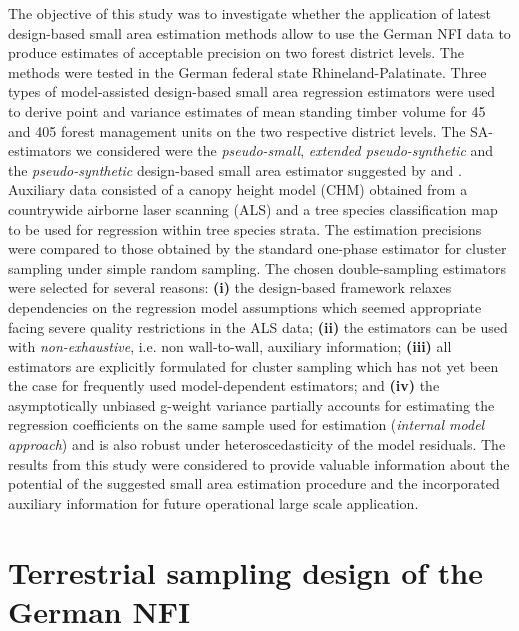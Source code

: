 \documentclass[remotesensing,article,submit,moreauthors,pdftex,10pt,a4paper]{mdpi}
\begin{document}
The objective of this study was to investigate whether the application of latest design-based small area estimation methods allow to use the German NFI data to produce estimates of acceptable precision on two forest district levels. The methods were tested in the German federal state Rhineland-Palatinate. Three types of model-assisted design-based small area regression estimators were used to derive point and variance estimates of mean standing timber volume for 45 and 405 forest management units on the two respective district levels. The SA-estimators we considered were the \textit{pseudo-small}, \textit{extended pseudo-synthetic} and the \textit{pseudo-synthetic} design-based small area estimator suggested by \citet{mandallaz2013a} and \citet{ mandallaz2013b}. Auxiliary data consisted of a canopy height model (CHM) obtained from a countrywide airborne laser scanning (ALS) and a tree species classification map to be used for regression within tree species strata. The estimation precisions were compared to those obtained by the standard one-phase estimator for cluster sampling under simple random sampling. The chosen double-sampling estimators were selected for several reasons: \textbf{(i)} the design-based framework relaxes dependencies on the regression model assumptions which seemed appropriate facing severe quality restrictions in the ALS data; \textbf{(ii)} the estimators can be used with \textit{non-exhaustive}, i.e. non wall-to-wall, auxiliary information; \textbf{(iii)} all estimators are explicitly formulated for cluster sampling which has not yet been the case for frequently used model-dependent estimators; and \textbf{(iv)} the asymptotically unbiased g-weight variance partially accounts for estimating the regression coefficients on the same sample used for estimation (\textit{internal model approach}) and is also robust under heteroscedasticity of the model residuals. The results from this study were considered to provide valuable information about the potential of the suggested small area estimation procedure and the incorporated auxiliary information for future operational large scale application.\par


\section{Terrestrial sampling design of the German NFI}
\label{sec:germanNFI}
\end{document}
